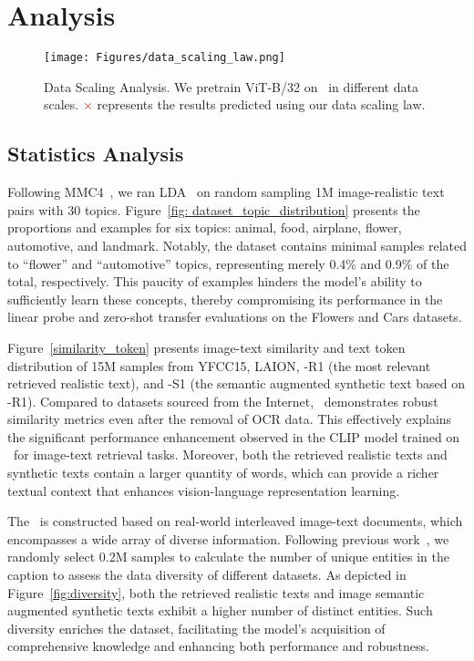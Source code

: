 \section{Analysis}

\begin{figure}[t!]
\centering
\texttt{[image: Figures/data\_scaling\_law.png]}
\vspace{-5mm}
\caption{Data Scaling Analysis. We pretrain ViT-B/32 on \dsname\ in different data scales. \textcolor{red}{$\times$} represents the results predicted using our data scaling law.}
\label{fig:data_scaling_analysis}
\vspace{-2mm}
\end{figure}

\subsection{Statistics Analysis} 
 Following MMC4~\cite{MMC4}, we ran LDA~\cite{LDA} on random sampling 1M image-realistic text pairs with 30 topics. Figure~\ref{fig: dataset_topic_distribution} presents the proportions and examples for six topics: animal, food, airplane, flower, automotive, and landmark. Notably, the dataset contains minimal samples related to ``flower'' and ``automotive'' topics, representing merely 0.4\% and 0.9\% of the total, respectively. This paucity of examples hinders the model's ability to sufficiently learn these concepts, thereby compromising its performance in the linear probe and zero-shot transfer evaluations on the Flowers and Cars datasets.


 Figure~\ref{similarity_token} presents image-text similarity and text token distribution of 15M samples from YFCC15, LAION, \dsname-R1 (the most relevant retrieved realistic text), and \dsname-S1 (the semantic augmented synthetic text based on \dsname-R1). Compared to datasets sourced from the Internet, \dsname\ demonstrates robust similarity metrics even after the removal of OCR data. This effectively explains the significant performance enhancement observed in the CLIP model trained on \dsname\ for image-text retrieval tasks.  Moreover, both the retrieved realistic texts and synthetic texts contain a larger quantity of words, which can provide a richer textual context that enhances vision-language representation learning.


 The \dsname\ is constructed based on real-world interleaved image-text documents, which encompasses a wide array of diverse information. Following previous work~\cite{lai2024revisit}, we randomly select 0.2M samples to calculate the number of unique entities in the caption to assess the data diversity of different datasets. As depicted in Figure~\ref{fig:diversity}, both the retrieved realistic texts and image semantic augmented synthetic texts exhibit a higher number of distinct entities. Such diversity enriches the dataset, facilitating the model's acquisition of comprehensive knowledge and enhancing both performance and robustness.



